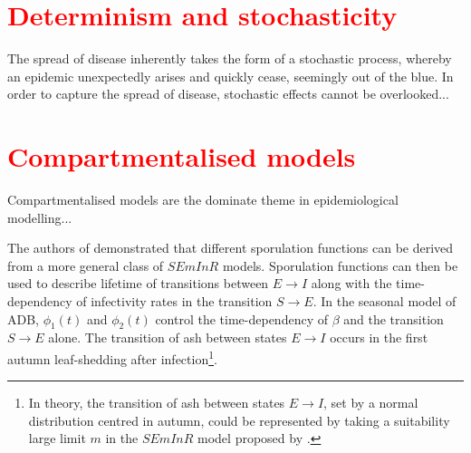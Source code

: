 \section{\textcolor{red}{Determinism and stochasticity}}

The spread of disease inherently takes the form of a stochastic process, whereby an epidemic unexpectedly arises and quickly cease, seemingly out of the blue. In order to capture the spread of disease, stochastic effects cannot be overlooked... 



\section{\textcolor{red}{Compartmentalised models}}
\label{ch2:lit-rev-compartmentalised-models}
Compartmentalised models are the dominate theme in epidemiological modelling...

\cite{segarra2001epidemic}

The authors of \cite{time-varying-infectivity} demonstrated that different sporulation functions can be derived from a more general class of $SEmInR$ models. 
Sporulation functions can then be used to describe lifetime of transitions between $E\rightarrow I$ along with the time-dependency of infectivity rates in the transition $S\rightarrow E$. 
In the seasonal model of ADB, $\phi_1(t)$ and $\phi_2(t)$ control the time-dependency of $\beta$ and the transition $S\rightarrow E$ alone.
The transition of ash between states $E\rightarrow I$ occurs in the first autumn leaf-shedding after infection\footnote{In theory, the transition of ash between states $E\rightarrow I$, set by a normal distribution centred in autumn, could be represented by taking a suitability large limit $m$ in the $SEmInR$ model proposed by \cite{time-varying-infectivity}.}. 


